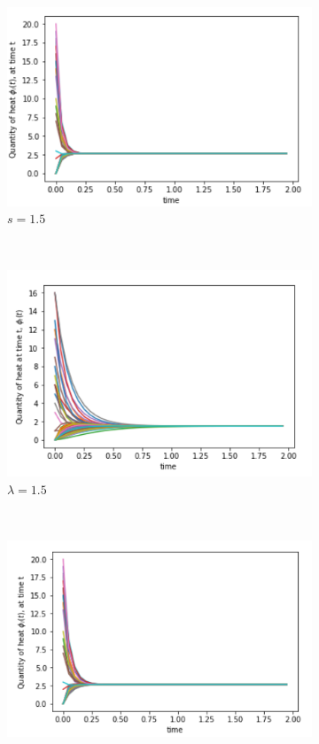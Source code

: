 \documentclass[10pt,a4paper]{article}
\begin{document}
        	\begin{figure}[H]
        	\centering
        	\begin{subfigure}[b]{0.45\textwidth}
        		\includegraphics[width=\textwidth]{images/Barabasi-Mellin15.png}
        		\caption{$s=1.5$}
        	\end{subfigure}~
        	\begin{subfigure}[b]{0.45\textwidth}
        		\includegraphics[width= \textwidth]{images/Barabasi-Laplace15.png}
        		\caption{$\lambda=1.5$}
        	\end{subfigure}\\
        	\begin{subfigure}[b]{0.45\textwidth}
        		\includegraphics[width= \textwidth]{images/Barabasi-Mellin2.png}

\end{subfigure}
\end{figure}
\end{document}
